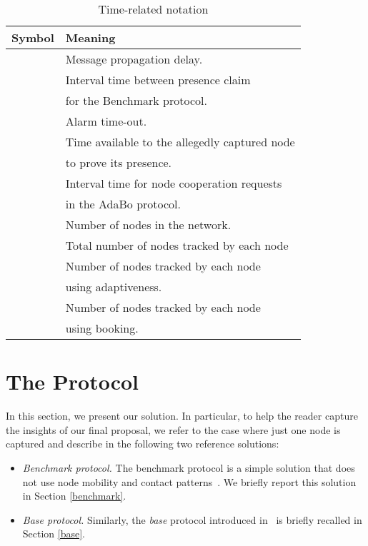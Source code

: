 \documentclass{IEEEconf}
\begin{document}
\begin{table}
\begin{center}
\begin{footnotesize}
\caption{Time-related notation}
\vspace{0.3cm}
\centering
\begin{tabular}{cl}
\hline
\textbf{Symbol} & \textbf{Meaning} \\
    \hline\hline
 & Message propagation delay. \\
    \hline
 & Interval time between presence claim\\
       & for the Benchmark protocol. \\
    \hline
 & Alarm time-out.\\ \hline
 & Time available to the allegedly captured node \\
         & to prove its presence.  \\ \hline
 & Interval time for node cooperation requests \\
	& in the AdaBo protocol. \\
\hline
 & Number of nodes in the network. \\
    \hline
 & Total number of nodes tracked by each node\\
\hline
 & Number of nodes tracked by each node\\
      & using adaptiveness.\\\hline
 & Number of nodes tracked by each node\\
      & using booking.\\\hline
\end{tabular}
\label{tabella_notazione}
\end{footnotesize}
\end{center}
\end{table}














\section{The Protocol}
\label{theprotocol}

In this section, we present our solution.
In particular, to help the reader capture the insights of our final proposal,
we refer to the case where just one node is captured and describe in the following two reference solutions:
\begin{itemize}
\item \textit{Benchmark protocol.} The benchmark protocol is a simple solution that does not use node mobility and contact patterns~\cite{CDMM:EURASIP:2009}. We briefly report this solution in Section \ref{benchmark}.
\item \textit{Base protocol.} Similarly, the
 {\em base} protocol introduced in~\cite{CDMM:WiSec08:Emergent, CDMM:EURASIP:2009}
is briefly recalled in Section \ref{base}.
\end{itemize}
\end{document}
